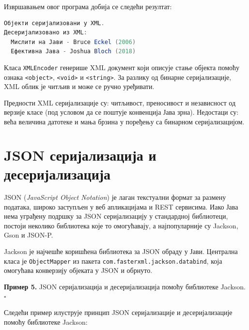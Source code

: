 Извршавањем овог програма добија се следећи резултат:


\begin{lstlisting}[language=Java]
Објекти серијализовани у XML.
Десеријализовано из XML:
  Мислити на Јави - Bruce Eckel (2006)
  Ефективна Јава - Joshua Bloch (2018)
\end{lstlisting}


Класа \texttt{XMLEncoder} генерише XML документ који описује стање објекта помоћу ознака \texttt{\textless{}object\textgreater{}}, \texttt{\textless{}void\textgreater{}} и \texttt{\textless{}string\textgreater{}}. За разлику од бинарне серијализације, XML облик је читљив и може се ручно уређивати.

Предности XML серијализације су: читљивост, преносивост и независност од верзије класе (под условом да се поштује конвенција Јава зрна). Недостаци су: већа величина датотеке и мања брзина у поређењу са бинарном серијализацијом.


\section{JSON серијализација и десеријализација}

JSON (\textit{JavaScript Object Notation}) је лаган текстуални формат за размену података, широко заступљен у веб апликацијама и REST сервисима. Иако Јава нема уграђену подршку за JSON серијализацију у стандардној библиотеци, постоји неколико библиотека које то омогућавају, а најпопуларније су Jackson, Gson и JSON-P.

Jackson је најчешће коришћена библиотека за JSON обраду у Јави. Централна класа је \texttt{ObjectMapper} из пакета \texttt{com.fasterxml.jackson.databind}, која омогућава конверзију објеката у JSON и обрнуто.


\bigskip

\noindent \textbf{Пример 5.} JSON серијализација и десеријализација помоћу библиотеке Jackson. $\square$

\medskip

Следећи пример илуструје принцип JSON серијализације и десеријализације помоћу библиотеке Jackson:


